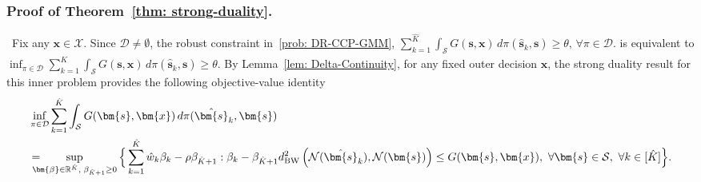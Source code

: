 \documentclass[opre,sglanonrev]{informs4}
\newcommand{\mD}{\mathcal{D}}
\newcommand{\mS}{\mathcal{S}}
\newcommand{\mN}{\mathcal{N}}
\newcommand{\mX}{\mathcal{X}}
\newcommand{\bbeta}{\bm{\beta}}
\newcommand{\bs}{\bm{s}}
\newcommand{\bx}{\bm{x}}
\begin{document}
{\begin{APPENDICES}
\subsubsection{Proof of Theorem~\ref{thm: strong-duality}.}\, 
Fix any \(\bx\in\mX\).  Since \(\mD\neq\emptyset\), the robust constraint in~\eqref{prob: DR-CCP-GMM}, $\sum_{k=1}^{\hat K}
\int_{\mS}G(\bs,\bx)\,d\pi(\hat{\bs}_k,\bs)
\ge\theta,\,
\forall \pi\in\mD.$ is equivalent to $\inf_{\pi\in\mD}
\sum_{k=1}^{\hat K}
\int_{\mS}G(\bs,\bx)\,d\pi(\hat{\bs}_k,\bs)
\ge\theta$.
By  Lemma~\ref{lem: Delta-Continuity}, for any fixed outer decision \(\bx\), the strong duality result for this inner problem  provides the following objective-value identity
\begin{align}\label{eq: strong-dual-eq}
&
\inf_{\pi\in\mD}
\sum_{k=1}^{\hat K}
\int_{\mS}G(\bs,\bx)\,d\pi(\hat{\bs}_k,\bs)
\\
&=\hspace{-1em}
\sup_{\bbeta\in\mathbb R^{\hat K},\;\beta_{\hat{K}+1}\ge0}
\Big\{
\sum_{k=1}^{\hat K}\hat w_k\beta_k-\rho\beta_{\hat{K}+1}:
\beta_k-\beta_{\hat{K}+1}
d_{\mathrm{BW}}^2
\left(
\mN(\hat{\bs}_k),\mN(\bs)
\right)
\le
G(\bs,\bx),\
\forall \bs\in\mS,\ \forall k\in[\hat K]
\Big\}. \nonumber
\end{align}



\end{APPENDICES}}
\end{document}
